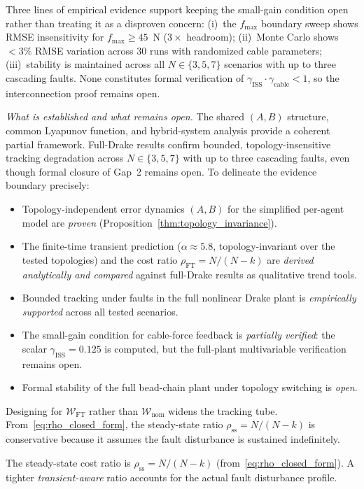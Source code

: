 Three lines of empirical evidence support keeping the small-gain condition open rather than treating it as a disproven concern: (i)~the $f_{\max}$ boundary sweep shows RMSE insensitivity for $f_{\max} \geq 45$~N ($3\times$ headroom); (ii)~Monte Carlo shows ${<}3\%$ RMSE variation across $30$ runs with randomized cable parameters; (iii)~stability is maintained across all $N \in \{3, 5, 7\}$ scenarios with up to three cascading faults. None constitutes formal verification of $\gamma_{\mathrm{ISS}} \cdot \gamma_{\mathrm{cable}} < 1$, so the interconnection proof remains open.

\emph{What is established and what remains open.} The shared $(A, B)$ structure, common Lyapunov function, and hybrid-system analysis provide a coherent partial framework. Full-Drake results confirm bounded, topology-insensitive tracking degradation across $N \in \{3, 5, 7\}$ with up to three cascading faults, even though formal closure of Gap~2 remains open. To delineate the evidence boundary precisely:
%
\begin{itemize}
  \item Topology-independent error dynamics $(A,B)$ for the simplified per-agent model are \emph{proven} (Proposition~\ref{thm:topology_invariance}).
  \item The finite-time transient prediction ($\alpha \approx 5.8$, topology-invariant over the tested topologies) and the cost ratio $\rho_{\mathrm{FT}} = N/(N{-}k)$ are \emph{derived analytically and compared} against full-Drake results as qualitative trend tools.
  \item Bounded tracking under faults in the full nonlinear Drake plant is \emph{empirically supported} across all tested scenarios.
  \item The small-gain condition for cable-force feedback is \emph{partially verified}: the scalar $\gamma_{\mathrm{ISS}} = 0.125$ is computed, but the full-plant multivariable verification remains open.
  \item Formal stability of the full bead-chain plant under topology switching is \emph{open}.
\end{itemize}

Designing for $\mathcal{W}_{\mathrm{FT}}$ rather than $\mathcal{W}_{\mathrm{nom}}$ widens the tracking tube. From~\eqref{eq:rho_closed_form}, the steady-state ratio $\rho_{\mathrm{ss}} = N/(N{-}k)$ is conservative because it assumes the fault disturbance is sustained indefinitely.

\begin{definition}\label{def:ft_cost}
The steady-state cost ratio is $\rho_{\mathrm{ss}} = N/(N{-}k)$ (from~\eqref{eq:rho_closed_form}). A tighter \emph{transient-aware} ratio accounts for the actual fault disturbance profile.
\end{definition}

